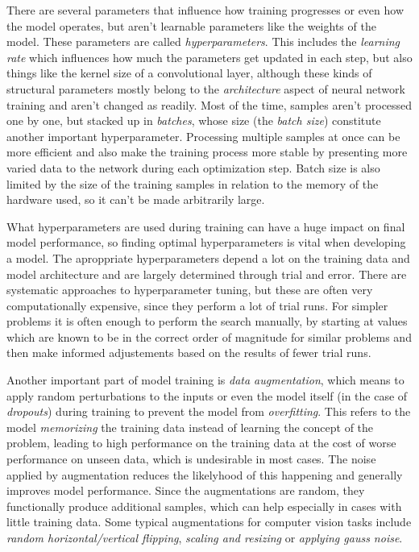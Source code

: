 There are several parameters that influence how training progresses or even how the model operates, but aren't learnable parameters like the weights of the model. These parameters are called \emph{hyperparameters}. This includes the \emph{learning rate} which influences how much the parameters get updated in each step, but also things like the kernel size of a convolutional layer, although these kinds of structural parameters mostly belong to the \emph{architecture} aspect of neural network training and aren't changed as readily. Most of the time, samples aren't processed one by one, but stacked up in \emph{batches}, whose size (the \emph{batch size}) constitute another important hyperparameter. Processing multiple samples at once can be more efficient and also make the training process more stable by presenting more varied data to the network during each optimization step. Batch size is also limited by the size of the training samples in relation to the memory of the hardware used, so it can't be made arbitrarily large. 

What hyperparameters are used during training can have a huge impact on final model performance, so finding optimal hyperparameters is vital when developing a model. The aproppriate hyperparameters depend a lot on the training data and model architecture and are largely determined through trial and error. There are systematic approaches to hyperparameter tuning, but these are often very computationally expensive, since they perform a lot of trial runs. For simpler problems it is often enough to perform the search manually, by starting at values which are known to be in the correct order of magnitude for similar problems and then make informed adjustements based on the results of fewer trial runs. 

Another important part of model training is \emph{data augmentation}, which means to apply random perturbations to the inputs or even the model itself (in the case of \emph{dropouts}) during training to prevent the model from \emph{overfitting}. This refers to the model \emph{memorizing} the training data instead of learning the concept of the problem, leading to high performance on the training data at the cost of worse performance on unseen data, which is undesirable in most cases. The noise applied by augmentation reduces the likelyhood of this happening and generally improves model performance. Since the augmentations are random, they functionally produce additional samples, which can help especially in cases with little training data. Some typical augmentations for computer vision tasks include \emph{random horizontal/vertical flipping}, \emph{scaling and resizing} or \emph{applying gauss noise}. 